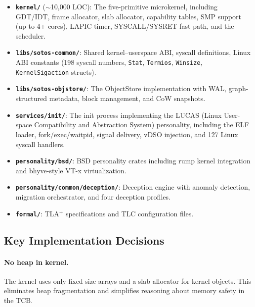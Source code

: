 \documentclass[11pt,a4paper]{article}
\theoremstyle{definition}
\theoremstyle{remark}
\begin{document}
\begin{itemize}[leftmargin=1.4em]
\item \textbf{\texttt{kernel/}} ($\sim$10{,}000 LOC): The five-primitive
  microkernel, including GDT/IDT, frame allocator, slab allocator,
  capability tables, SMP support (up to 4+ cores), LAPIC timer,
  SYSCALL/SYSRET fast path, and the scheduler.

\item \textbf{\texttt{libs/sotos-common/}}: Shared kernel--userspace
  ABI, syscall definitions, Linux ABI constants (198 syscall numbers,
  \texttt{Stat}, \texttt{Termios}, \texttt{Winsize},
  \texttt{KernelSigaction} structs).

\item \textbf{\texttt{libs/sotos-objstore/}}: The ObjectStore
  implementation with WAL, graph-structured metadata, block management,
  and CoW snapshots.

\item \textbf{\texttt{services/init/}}: The init process implementing
  the LUCAS (Linux User-space Compatibility and Abstraction System)
  personality, including the ELF loader, fork/exec/waitpid, signal
  delivery, vDSO injection, and 127 Linux syscall handlers.

\item \textbf{\texttt{personality/bsd/}}: BSD personality crates
  including rump kernel integration and bhyve-style VT-x
  virtualization.

\item \textbf{\texttt{personality/common/deception/}}: Deception engine
  with anomaly detection, migration orchestrator, and four deception
  profiles.

\item \textbf{\texttt{formal/}}: TLA$^+$ specifications and TLC
  configuration files.
\end{itemize}

\subsection{Key Implementation Decisions}
\label{sec:impl-decisions}

\paragraph{No heap in kernel.}
The kernel uses only fixed-size arrays and a slab allocator for
kernel objects. This eliminates heap fragmentation and simplifies
reasoning about memory safety in the TCB.
\end{document}
